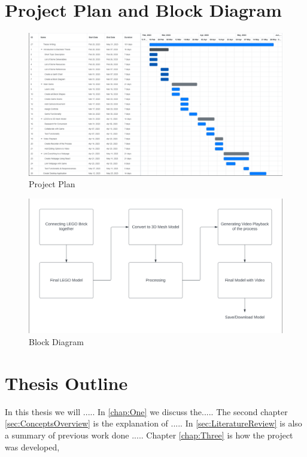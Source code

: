  \section{Project Plan and Block Diagram }
 \begin{figure}[H]
    \centering
    \includegraphics[width = 15 cm]{Project Plan.png}
    \caption{Project Plan}
    \label{fig:Project Plan ScreenShot}
\end{figure}
\begin{figure}[H]
    \centering
    \includegraphics[width = 15 cm]{Block Diagram.png}
    \caption{Block Diagram }
    \label{fig:Block Diagram ScreenShot}
\end{figure}
\section{Thesis Outline}
In this thesis we will ..... In \ref{chap:One} we discuss the..... The second chapter \ref{sec:ConceptsOverview} is the explanation of .....
In \ref{sec:LiteratureReview} is also a summary of previous work done ..... 
Chapter \ref{chap:Three} is how the project was developed, 


